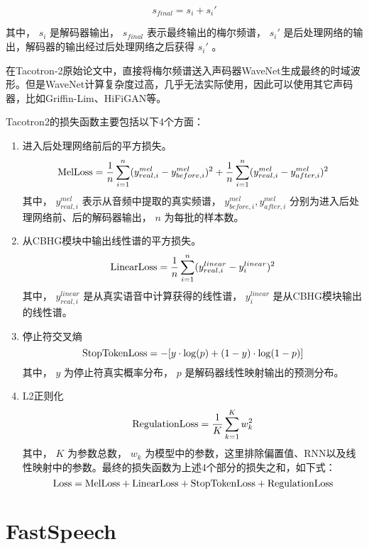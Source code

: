 \documentclass[cn,10pt,math=newtx,citestyle=gb7714-2015,bibstyle=gb7714-2015]{elegantbook}
\begin{document}
\begin{equation}
  s_{final}=s_i+s_i'
\end{equation}

其中， $s_i$ 是解码器输出， $s_{final}$ 表示最终输出的梅尔频谱， $s_i'$ 是后处理网络的输出，解码器的输出经过后处理网络之后获得 $s_i'$ 。

在Tacotron-2原始论文中，直接将梅尔频谱送入声码器WaveNet生成最终的时域波形。但是WaveNet计算复杂度过高，几乎无法实际使用，因此可以使用其它声码器，比如Griffin-Lim、HiFiGAN等。

Tacotron2的损失函数主要包括以下4个方面：

\begin{enumerate}
  \item 进入后处理网络前后的平方损失。
  \begin{equation}
    {\rm MelLoss}=\frac{1}{n}\sum_{i=1}^n(y_{real,i}^{mel}-y_{before,i}^{mel})^2+\frac{1}{n}\sum_{i=1}^n(y_{real,i}^{mel}-y_{after,i}^{mel})^2
  \end{equation}
  其中， $y_{real,i}^{mel}$ 表示从音频中提取的真实频谱， $y_{before,i}^{mel},y_{after,i}^{mel}$ 分别为进入后处理网络前、后的解码器输出， $n$ 为每批的样本数。
  \item 从CBHG模块中输出线性谱的平方损失。
  \begin{equation}
    {\rm LinearLoss}=\frac{1}{n}\sum_{i=1}^{n}(y_{real,i}^{linear}-y_{i}^{linear})^2
  \end{equation}
  其中， $y_{real,i}^{linear}$ 是从真实语音中计算获得的线性谱， $y_{i}^{linear}$ 是从CBHG模块输出的线性谱。
  \item 停止符交叉熵
  \begin{equation}
    {\rm StopTokenLoss}=-[y\cdot {\rm log}(p)+(1-y)\cdot {\rm log}(1-p)]
  \end{equation}
  其中， $y$ 为停止符真实概率分布， $p$ 是解码器线性映射输出的预测分布。
  \item L2正则化
  \begin{equation}
    {\rm RegulationLoss}=\frac{1}{K}\sum_{k=1}^K w_k^2
  \end{equation}
  其中， $K$ 为参数总数， $w_k$ 为模型中的参数，这里排除偏置值、RNN以及线性映射中的参数。最终的损失函数为上述4个部分的损失之和，如下式：
  \begin{equation}
    {\rm Loss}={\rm MelLoss}+{\rm LinearLoss}+{\rm StopTokenLoss}+{\rm RegulationLoss}
  \end{equation}
\end{enumerate}

\section{FastSpeech}
\end{document}
